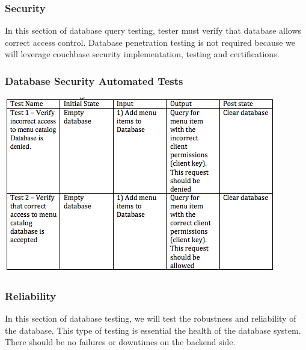 \documentclass[12pt]{article}
\begin{document}
\subsubsection{Security}
In this section of database query testing, tester must verify that database allows correct access control. Database penetration testing is not required because we will leverage couchbase security implementation, testing and certifications.
\subsubsection{Database Security Automated Tests }
\includegraphics[width=\textwidth,height=\textheight,keepaspectratio]{Security_tests.png}

\subsubsection{Reliability}
In this section of database testing, we will test the robustness and reliability of the database.  This type of testing is essential the health of the database system. There should be no failures or downtimes on the backend side. 
\end{document}
